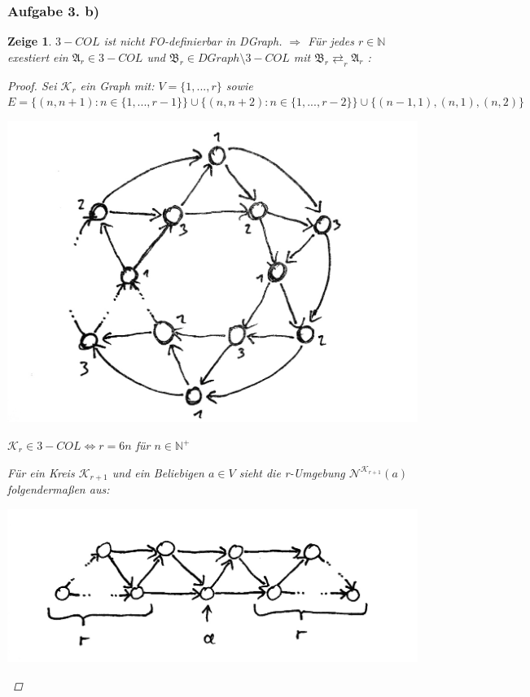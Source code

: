 \documentclass[12pt]{article}
\newtheorem{zeige}{Zeige}
\begin{document}
\subsubsection*{Aufgabe 3. b)}
\begin{zeige}
  $3-COL$ ist nicht FO-definierbar in DGraph.
  $\Rightarrow $
  Für jedes $r\in\mathbb{N}$ exestiert ein $\mathfrak{A}_r \in  3-COL$ und $\mathfrak{B}_r \in DGraph \setminus 3-COL$ mit $\mathfrak{B}_r\rightleftarrows_r \mathfrak{A}_r$ :\\
  \begin{proof}
    Sei $\mathcal{K}_r$ ein Graph mit: $V=\{1,...,r\}$ sowie $
    E=
    \{(n,n+1): n\in\{1,...,r-1\}\} \cup 
    \{(n,n+2): n\in\{1,...,r-2\}\} \cup
    \{(n-1,1),(n,1),(n,2)\}$
    
    \begin{center}
      \includegraphics[scale=0.2]{circle.jpg}
    \end{center}
    
    $\mathcal{K}_r \in 3-COL \Leftrightarrow r=6n$ für $n\in\mathbb{N}^+$
    
    Für ein Kreis $\mathcal{K}_{r+1}$ und ein Beliebigen $a\in V$ sieht die r-Umgebung $\mathcal{N}^{\mathcal{K}_{r+1}}(a)$ folgendermaßen aus:
    
    \begin{center}
      \includegraphics[scale=0.2]{r-env.jpg}
    \end{center}
    

\end{proof}
\end{zeige}
\end{document}
